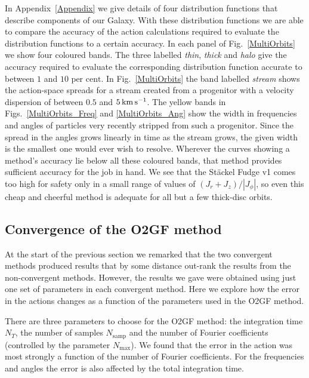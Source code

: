 \documentclass[useAMS,usenatbib,fleqn,a4paper]{mn2e}
\def\kms{\,{\rm km\,s^{-1}}}
\def\percent{\text{ per cent}}
\def\percent{\text{ per cent}}
\begin{document}
In Appendix~\ref{Appendix} we give details of four distribution functions
that describe components of our Galaxy. With these distribution functions we
are able to compare the accuracy of the action calculations required to
evaluate the distribution functions to a certain accuracy. In each panel of
Fig.~\ref{MultiOrbits} we show four coloured bands. The three labelled
\emph{thin}, \emph{thick} and \emph{halo} give the accuracy required to
evaluate the corresponding distribution function accurate to between $1$ and
$10\percent$.  In Fig.~\ref{MultiOrbits} the band labelled \emph{stream} shows the
action-space spreads for a stream created from a progenitor with a velocity
dispersion of between $0.5$ and $5\kms$.  The yellow bands in
Figs.~\ref{MultiOrbits_Freq} and \ref{MultiOrbits_Ang} show the width in
frequencies and angles of particles very recently stripped from such a
progenitor. Since the spread in the angles grows linearly in time as the
stream grows, the given width is the smallest one would ever wish to resolve.
Wherever the curves showing a method's accuracy lie below all these coloured
bands, that method provides sufficient accuracy for the job in hand. We see
that the St\"ackel Fudge v1 comes too high for safety only in a small range
of values of $(J_r+J_z)/|J_\phi|$, so even this cheap and cheerful method is
adequate for all but a few thick-disc orbits.

\subsection{Convergence of the O2GF method}

At the start of the previous section we remarked that the two convergent
methods produced results that by some distance out-rank the results from the
non-convergent methods. However, the results we gave were obtained using just
one set of parameters in each convergent method.  Here we explore how the
error in the actions changes as a function of the parameters used in the O2GF
method.

There are three parameters to choose for the O2GF method: the
integration time $N_T$, the number of samples $N_\mathrm{samp}$ and the
number of Fourier coefficients (controlled by the parameter
$N_\mathrm{max}$). We found that the error in the action
was most strongly a function of the number of Fourier coefficients. For the
frequencies and angles the error is also affected by the total integration
time.
\end{document}
